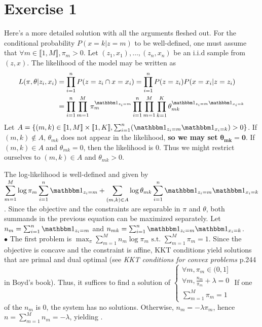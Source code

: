 \documentclass[a4paper,11pt]{article}
\begin{document}
\newpage
\section*{Exercise 1}
Here's a more detailed solution with all the arguments fleshed out.\newline
For the conditional probability $P(x=k|z=m)$ to be well-defined, one must assume that $\forall m\in \llbracket1,M\rrbracket, \pi_m>0$. Let $(z_1,x_1),\ldots,(z_n,x_n)$ be an i.i.d sample from $(z,x)$. The likelihood of the model may be written as 
$$\begin{aligned}
  L(\pi,\theta|z_i,x_i) &= \prod_{i=1}^n P(z=z_i\cap x=x_i) = \prod_{i=1}^n P(z=z_i)P(x=x_i|z=z_i)\\
  &= \prod_{i=1}^n \prod_{m=1}^M\pi_m^{\mathbbm 1_{z_i=m}} \prod_{i=1}^n \prod_{m=1}^M\prod_{k=1}^K \theta_{mk}^{\mathbbm 1_{z_i=m} \mathbbm 1_{x_i=k}}
\end{aligned}$$
Let $A=\{(m,k)\in \llbracket1,M\rrbracket \times \llbracket1,K\rrbracket, \sum_{i=1}^n (\mathbbm 1_{z_i=m} \mathbbm 1_{x_i=k}) >0\}$. If $(m,k)\notin A$, $\theta_{mk}$ does not appear in the likelihood, \textbf{so we may set} $\bm{\theta_{mk} =0}$. If $(m,k)\in A$ and $\theta_{mk}=0$, then the likelihood is $0$. Thus we might restrict ourselves to $(m,k)\in A$ and $\theta_{mk}>0$.

\noindent The log-likelihood is well-defined and given by $\displaystyle \sum_{m=1}^M \log \pi_m \sum_{i=1}^n \mathbbm 1_{z_i=m} + \sum_{(m,k)\in A} \log \theta_{mk} \sum_{i=1}^n \mathbbm 1_{z_i=m}\mathbbm 1_{x_i=k}$.
Since the objective and the constraints are separable in $\pi$ and $\theta$, both summands in the previous equation can be maximized separately. Let $n_m=\sum_{i=1}^n \mathbbm 1_{z_i=m}$ and $n_{mk}=\sum_{i=1}^n \mathbbm 1_{z_i=m}\mathbbm 1_{x_i=k}$.\\

\noindent $\bullet$ The first problem is $\max_{\pi} \sum_{m=1}^M n_m\log \pi_m \text{ s.t. } \sum_{m=1}^M \pi_m = 1$. Since the objective is concave and the constraint is affine, KKT conditions yield solutions that are primal and dual optimal (see \textit{KKT conditions for convex problems} p.244 in Boyd's book). Thus, it suffices to find a solution of $\begin{cases}
  \forall m, \pi_m\in (0,1] \\
  \forall m, \frac{n_m}{\pi_m} + \lambda = 0 \\
  \sum_{m=1}^M \pi_m = 1
\end{cases}$\newline
 If one of the $n_m$ is $0$, the system has no solutions. Otherwise, $n_m = -\lambda \pi_m$, hence $n=\sum_{m=1}^Mn_m=-\lambda$, yielding .\\
\end{document}
